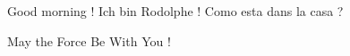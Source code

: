 \documentclass[12pt]{lettre}
\begin{document}
	\begin{letter}
	\opening{Good morning ! Ich bin Rodolphe ! Como esta dans la casa ?}
	\lipsum[1-2]
	\closing{May the Force Be With You !}
	\end{letter}
\end{document}
